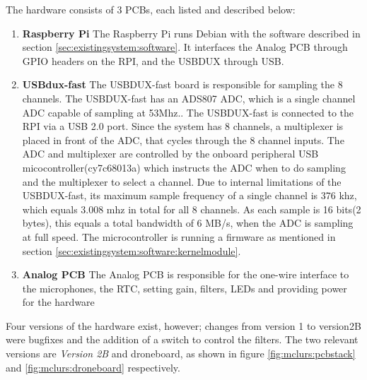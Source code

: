 The hardware consists of 3 PCBs, each listed and described below:
\begin{enumerate}
	\item \textbf{Raspberry Pi} The Raspberry Pi runs Debian with the software described in section \ref{sec:existingsystem:software}. It interfaces the Analog PCB through GPIO headers on the RPI, and the USBDUX through USB.
	
	\item \textbf{USBdux-fast} The USBDUX-fast board is responsible for sampling the 8 channels. The USBDUX-fast has an ADS807 ADC, which is a single channel ADC capable of sampling at 53Mhz.\citep{ADC:ADS807}. The USBDUX-fast is connected to the RPI via a USB 2.0 port.
Since the system has 8 channels, a multiplexer is placed in front of the ADC, that cycles through the 8 channel inputs.
The ADC and multiplexer are controlled by the onboard peripheral USB micocontroller(cy7c68013a) which instructs the ADC when to do sampling and the multiplexer to select a channel. Due to internal limitations of the USBDUX-fast, its maximum sample frequency of a single channel is 376 khz, which equals 3.008 mhz in total for all 8 channels. As each sample is 16 bits(2 bytes), this equals a total bandwidth of 6 MB/s, when the ADC is sampling at full speed. The microcontroller is running a firmware as mentioned in section \ref{sec:existingsystem:software:kernelmodule}.
	
	\item \textbf{Analog PCB} The Analog PCB is responsible for the one-wire interface to the microphones, the \ac{RTC}, setting gain, filters, LEDs and providing power for the hardware
\end{enumerate}

Four versions of the hardware exist, however; changes from version 1 to version2B were bugfixes and the addition of a switch to control the filters. The two relevant versions are \textit{Version 2B} and droneboard, as shown in figure \ref{fig:mclurs:pcbstack} and \ref{fig:mclurs:droneboard} respectively.

